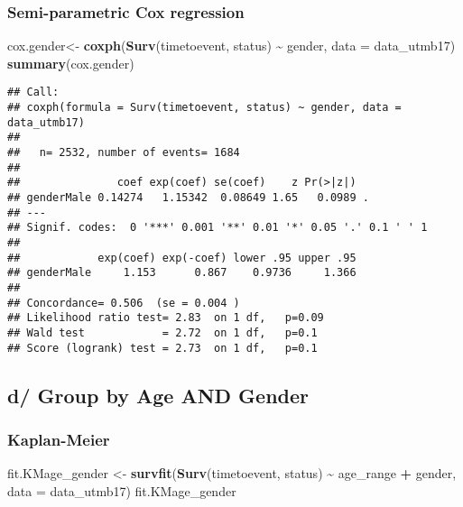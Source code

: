 \documentclass[
]{article}
\newenvironment{Shaded}{\begin{snugshade}}{\end{snugshade}}
\newcommand{\AttributeTok}[1]{\textcolor[rgb]{0.13,0.29,0.53}{#1}}
\newcommand{\FunctionTok}[1]{\textcolor[rgb]{0.13,0.29,0.53}{\textbf{#1}}}
\newcommand{\NormalTok}[1]{#1}
\newcommand{\OtherTok}[1]{\textcolor[rgb]{0.56,0.35,0.01}{#1}}
\newcommand{\SpecialCharTok}[1]{\textcolor[rgb]{0.81,0.36,0.00}{\textbf{#1}}}
\begin{document}
\hypertarget{semi-parametric-cox-regression-1}{%
\subsubsection{\texorpdfstring{Semi-parametric Cox regression
}{Semi-parametric Cox regression }}\label{semi-parametric-cox-regression-1}}

\begin{Shaded}
\begin{Highlighting}[]
\NormalTok{cox.gender}\OtherTok{\textless{}{-}} \FunctionTok{coxph}\NormalTok{(}\FunctionTok{Surv}\NormalTok{(timetoevent, status) }\SpecialCharTok{\textasciitilde{}}\NormalTok{ gender, }\AttributeTok{data =}\NormalTok{ data\_utmb17)}
\FunctionTok{summary}\NormalTok{(cox.gender)}
\end{Highlighting}
\end{Shaded}

\begin{verbatim}
## Call:
## coxph(formula = Surv(timetoevent, status) ~ gender, data = data_utmb17)
## 
##   n= 2532, number of events= 1684 
## 
##               coef exp(coef) se(coef)    z Pr(>|z|)  
## genderMale 0.14274   1.15342  0.08649 1.65   0.0989 .
## ---
## Signif. codes:  0 '***' 0.001 '**' 0.01 '*' 0.05 '.' 0.1 ' ' 1
## 
##            exp(coef) exp(-coef) lower .95 upper .95
## genderMale     1.153      0.867    0.9736     1.366
## 
## Concordance= 0.506  (se = 0.004 )
## Likelihood ratio test= 2.83  on 1 df,   p=0.09
## Wald test            = 2.72  on 1 df,   p=0.1
## Score (logrank) test = 2.73  on 1 df,   p=0.1
\end{verbatim}

\hypertarget{d-group-by-age-and-gender}{%
\subsection{\texorpdfstring{d/ Group by Age AND Gender
}{d/ Group by Age AND Gender }}\label{d-group-by-age-and-gender}}

\hypertarget{kaplan-meier}{%
\subsubsection{Kaplan-Meier}\label{kaplan-meier}}

\begin{Shaded}
\begin{Highlighting}[]
\NormalTok{fit.KMage\_gender }\OtherTok{\textless{}{-}} \FunctionTok{survfit}\NormalTok{(}\FunctionTok{Surv}\NormalTok{(timetoevent, status) }\SpecialCharTok{\textasciitilde{}}\NormalTok{ age\_range }\SpecialCharTok{+}\NormalTok{ gender, }\AttributeTok{data =}\NormalTok{ data\_utmb17)}
\NormalTok{fit.KMage\_gender}
\end{Highlighting}
\end{Shaded}
\end{document}
